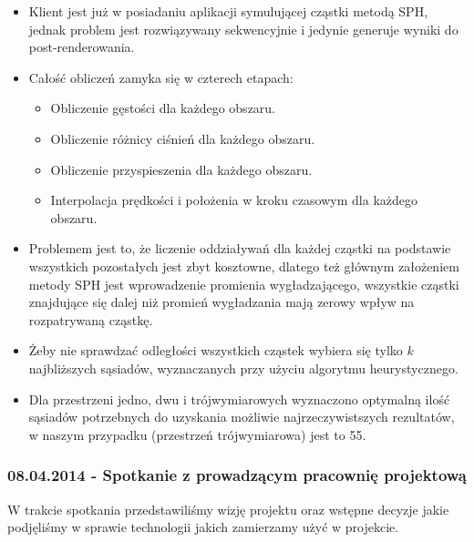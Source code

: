 \documentclass[polish, 12pt]{aghthesis}
\begin{document}
			\begin{itemize}
			
				\item Klient jest już w posiadaniu aplikacji symulującej cząstki metodą SPH, jednak problem jest rozwiązywany sekwencyjnie i jedynie generuje wyniki do post-renderowania.
				\item Całość obliczeń zamyka się w czterech etapach:
				\begin{itemize}
				
					\item Obliczenie gęstości dla każdego obszaru.
					\item Obliczenie różnicy ciśnień dla każdego obszaru.
					\item Obliczenie przyspieszenia dla każdego obszaru.
					\item Interpolacja prędkości i położenia w kroku czasowym dla każdego obszaru.
				
				\end{itemize}
				\item Problemem jest to, że liczenie oddziaływań dla każdej cząstki na podstawie wszystkich pozostałych jest zbyt kosztowne, dlatego też głównym założeniem metody SPH jest wprowadzenie promienia wygładzającego, wszystkie cząstki znajdujące się dalej niż promień wygładzania mają zerowy wpływ na rozpatrywaną cząstkę.
				\item Żeby nie sprawdzać odległości wszystkich cząstek wybiera się tylko $k$ najbliższych sąsiadów, wyznaczanych przy użyciu algorytmu heurystycznego.
				\item Dla przestrzeni jedno, dwu i trójwymiarowych wyznaczono optymalną ilość sąsiadów potrzebnych do uzyskania możliwie najrzeczywistszych rezultatów, w naszym przypadku (przestrzeń trójwymiarowa) jest to 55.
			
			\end{itemize}
		
		\subsubsection*{08.04.2014 - Spotkanie z prowadzącym pracownię projektową}
		
			W trakcie spotkania przedstawiliśmy wizję projektu oraz wstępne decyzje jakie podjęliśmy w sprawie technologii jakich zamierzamy użyć w projekcie.
			
\end{document}
